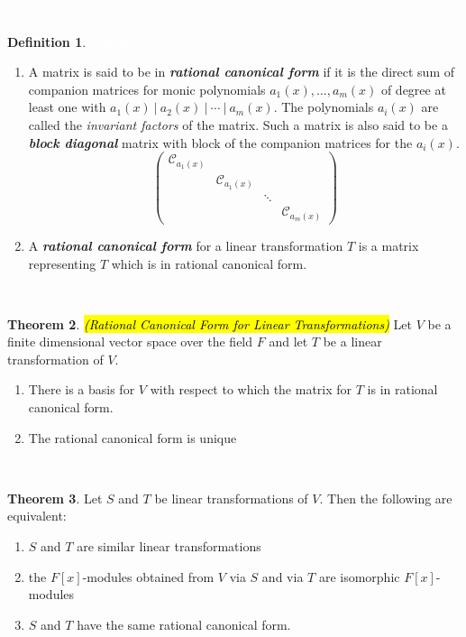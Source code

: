 \documentclass{article}
\theoremstyle{definition}
\newtheorem{thm}{Theorem}[section]
\newtheorem{defn}[thm]{Definition}
\newcommand{\nl}{\textcolor{white}{nothing}}
\newcommand{\CC}{\mathcal{C}}
\begin{document}
\nl

\begin{defn}\nl
\begin{enumerate}
\item A matrix is said to be in \textit{\textbf{rational canonical form}} if it is the direct sum of companion matrices for monic polynomials $a_1(x), \ldots, a_m(x)$ of degree at least one with $a_1(x)\ |\  a_2(x)\ |\ \cdots\ |\  a_m(x).$ The polynomials $a_i(x)$ are called the \textit{invariant factors} of the matrix. Such a matrix is also said to be a \textit{\textbf{block diagonal}} matrix with block of the companion matrices for the $a_i(x)$.
\[\begin{pmatrix}
\CC_{a_1(x)} & & & \\
& \CC_{a_1(x)} & & \\
& & \ddots & \\
& & & \CC_{a_m(x)}
\end{pmatrix}\]
\item A \textit{\textbf{rational canonical form}} for a linear transformation $T$ is a matrix representing $T$ which is in rational canonical form.
\end{enumerate}
\end{defn}

\nl

\begin{thm}\hl{\textit{(Rational Canonical Form for Linear Transformations)}}
Let $V$ be a finite dimensional vector space over the field $F$ and let $T$ be a linear transformation of $V$.
\begin{enumerate}
\item There is a basis for $V$ with respect to which the matrix for $T$ is in rational canonical form.
\item The rational canonical form is unique
\end{enumerate}
\end{thm}

\nl

\begin{thm}
Let $S$ and $T$ be linear transformations of $V$. Then the following are equivalent:
\begin{enumerate}
\item $S$ and $T$ are similar linear transformations
\item the $F[x]$-modules obtained from $V$ via $S$ and via $T$ are isomorphic $F[x]$-modules
\item $S$ and $T$ have the same rational canonical form.
\end{enumerate}
\end{thm}
\end{document}
